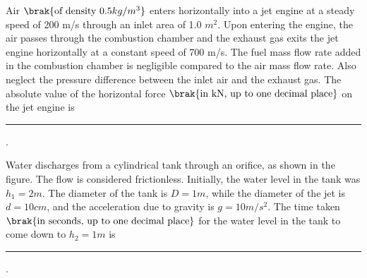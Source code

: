 \iffalse
  \title{GateAssignment8}
  \author{EE24BTECH11048-NITHIN.K}
  \section{xe}
  \chapter{2021} 
\fi
\item Air $\brak{\text{of density 0.5} kg/m^3}$ enters horizontally into a jet engine at a steady speed of 200 m/s through an inlet area of 1.0 $m^2$. Upon entering the engine, the air passes through the combustion chamber and the exhaust gas exits the jet engine horizontally at a constant speed of 700 m/s. The fuel mass flow rate added in the combustion chamber is negligible compared to the air mass flow rate. Also neglect the pressure difference between the inlet air and the exhaust gas. The absolute value of the horizontal force $\brak{\text{in kN, up to one decimal place}}$ on the jet engine is \rule{1cm}{0.4pt}.
\item Water discharges from a cylindrical tank through an orifice, as shown in the figure. The flow is considered frictionless. Initially, the water level in the tank was $h_1 = 2 m$. The diameter of the tank is $D = 1 m$, while the diameter of the jet is $d = 10 cm$, and the acceleration due to gravity is $g = 10m/s^2$. The time taken $\brak{\text{in seconds, up to one decimal place}}$ for the water level in the tank to come down to $h_2 = 1m$ is \rule{1cm}{0.4pt}.
	\begin{figure}[H]
		\centering
	\end{figure}
